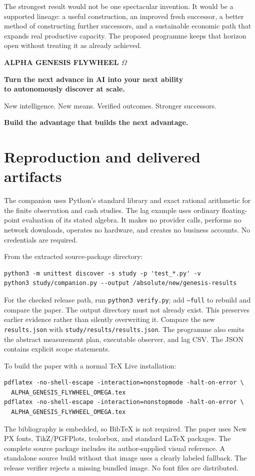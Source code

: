\documentclass[11pt,letterpaper]{article}
\theoremstyle{remark}\newtheorem{remark}{Remark}[section]
\begin{document}
The strongest result would not be one spectacular invention. It would be a supported lineage: a useful construction, an improved fresh successor, a better method of constructing further successors, and a sustainable economic path that expands real productive capacity. The proposed programme keeps that horizon open without treating it as already achieved.

\begin{thesisbox}
\begin{center}
{\Large\bfseries\color{Violet}ALPHA GENESIS FLYWHEEL $\Omega$}\par\medskip
\textbf{Turn the next advance in AI into your next ability\\to autonomously discover at scale.}\par\medskip
New intelligence. New means. Verified outcomes. Stronger successors.\par\medskip
\textbf{Build the advantage that builds the next advantage.}
\end{center}
\end{thesisbox}

\clearpage
\appendix
\section{Reproduction and delivered artifacts}
\label{app:reproduce}
The companion uses Python's standard library and exact rational arithmetic for the finite observation and cash studies. The lag example uses ordinary floating-point evaluation of its stated algebra. It makes no provider calls, performs no network downloads, operates no hardware, and creates no business accounts. No credentials are required.

From the extracted source-package directory:
\begin{lstlisting}
python3 -m unittest discover -s study -p 'test_*.py' -v
python3 study/companion.py --output /absolute/new/genesis-results
\end{lstlisting}
For the checked release path, run \texttt{python3 verify.py}; add \texttt{--full} to rebuild and compare the paper. The output directory must not already exist. This preserves earlier evidence rather than silently overwriting it. Compare the new \texttt{results.json} with \texttt{study/results/results.json}. The programme also emits the abstract measurement plan, executable observer, and lag CSV. The JSON contains explicit scope statements.

To build the paper with a normal TeX Live installation:
\begin{lstlisting}
pdflatex -no-shell-escape -interaction=nonstopmode -halt-on-error \
  ALPHA_GENESIS_FLYWHEEL_OMEGA.tex
pdflatex -no-shell-escape -interaction=nonstopmode -halt-on-error \
  ALPHA_GENESIS_FLYWHEEL_OMEGA.tex
\end{lstlisting}
The bibliography is embedded, so BibTeX is not required. The paper uses New PX fonts, TikZ/PGFPlots, tcolorbox, and standard LaTeX packages. The complete source package includes its author-supplied visual reference. A standalone source build without that image uses a clearly labeled fallback. The release verifier rejects a missing bundled image. No font files are distributed.
\end{document}
